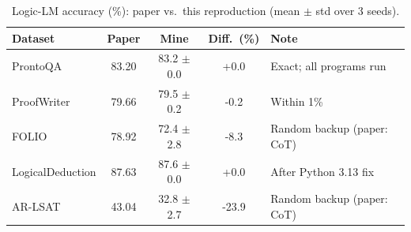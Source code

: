 \begin{table}[t]
\caption{Logic-LM accuracy (\%): paper vs.\ this reproduction (mean $\pm$ std over 3 seeds).}
\label{tab:results}
\centering\footnotesize
\setlength{\tabcolsep}{3pt}
\begin{tabular}{lcccp{2.2cm}}
\hline
Dataset & Paper & Mine & Diff.\ (\%) & Note \\
\hline
ProntoQA & 83.20 & 83.2 $\pm$ 0.0 & +0.0 & Exact; all programs run \\
ProofWriter & 79.66 & 79.5 $\pm$ 0.2 & -0.2 & Within 1\% \\
FOLIO & 78.92 & 72.4 $\pm$ 2.8 & -8.3 & Random backup (paper: CoT) \\
LogicalDeduction & 87.63 & 87.6 $\pm$ 0.0 & +0.0 & After Python 3.13 fix \\
AR-LSAT & 43.04 & 32.8 $\pm$ 2.7 & -23.9 & Random backup (paper: CoT) \\
\hline
\end{tabular}
\end{table}
